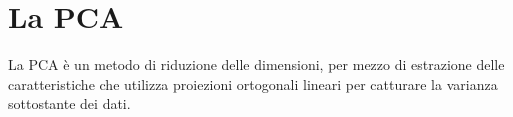 \section{La PCA}
\label{PCA}

La PCA \`e un metodo  di riduzione delle dimensioni, per mezzo di estrazione delle caratteristiche che utilizza proiezioni ortogonali lineari per catturare la varianza sottostante dei dati.